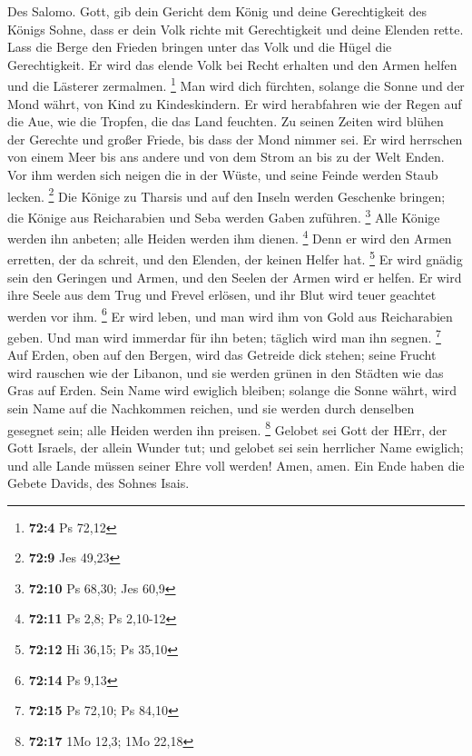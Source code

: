  Des Salomo. Gott, gib dein Gericht dem König und deine
Gerechtigkeit des Königs Sohne,  dass er dein Volk richte
mit Gerechtigkeit und deine Elenden rette.  Lass die Berge
den Frieden bringen unter das Volk und die Hügel die Gerechtigkeit.
 Er wird das elende Volk bei Recht erhalten und den Armen
helfen und die Lästerer zermalmen. \footnote{\textbf{72:4} Ps 72,12}
 Man wird dich fürchten, solange die Sonne und der Mond
währt, von Kind zu Kindeskindern.  Er wird herabfahren wie
der Regen auf die Aue, wie die Tropfen, die das Land feuchten.
 Zu seinen Zeiten wird blühen der Gerechte und großer
Friede, bis dass der Mond nimmer sei.  Er wird herrschen
von einem Meer bis ans andere und von dem Strom an bis zu der Welt
Enden.  Vor ihm werden sich neigen die in der Wüste, und
seine Feinde werden Staub lecken. \footnote{\textbf{72:9} Jes 49,23}
 Die Könige zu Tharsis und auf den Inseln werden
Geschenke bringen; die Könige aus Reicharabien und Seba werden Gaben
zuführen. \footnote{\textbf{72:10} Ps 68,30; Jes 60,9} 
Alle Könige werden ihn anbeten; alle Heiden werden ihm dienen.
\footnote{\textbf{72:11} Ps 2,8; Ps 2,10-12}  Denn er
wird den Armen erretten, der da schreit, und den Elenden, der keinen
Helfer hat. \footnote{\textbf{72:12} Hi 36,15; Ps 35,10} 
Er wird gnädig sein den Geringen und Armen, und den Seelen der Armen
wird er helfen.  Er wird ihre Seele aus dem Trug und
Frevel erlösen, und ihr Blut wird teuer geachtet werden vor ihm.
\footnote{\textbf{72:14} Ps 9,13}  Er wird leben, und man
wird ihm von Gold aus Reicharabien geben. Und man wird immerdar für ihn
beten; täglich wird man ihn segnen. \footnote{\textbf{72:15} Ps 72,10;
  Ps 84,10}  Auf Erden, oben auf den Bergen, wird das
Getreide dick stehen; seine Frucht wird rauschen wie der Libanon, und
sie werden grünen in den Städten wie das Gras auf Erden. 
Sein Name wird ewiglich bleiben; solange die Sonne währt, wird sein Name
auf die Nachkommen reichen, und sie werden durch denselben gesegnet
sein; alle Heiden werden ihn preisen. \footnote{\textbf{72:17} 1Mo 12,3;
  1Mo 22,18}  Gelobet sei Gott der HErr, der Gott
Israels, der allein Wunder tut;  und gelobet sei sein
herrlicher Name ewiglich; und alle Lande müssen seiner Ehre voll werden!
Amen, amen.  Ein Ende haben die Gebete Davids, des Sohnes
Isais.

